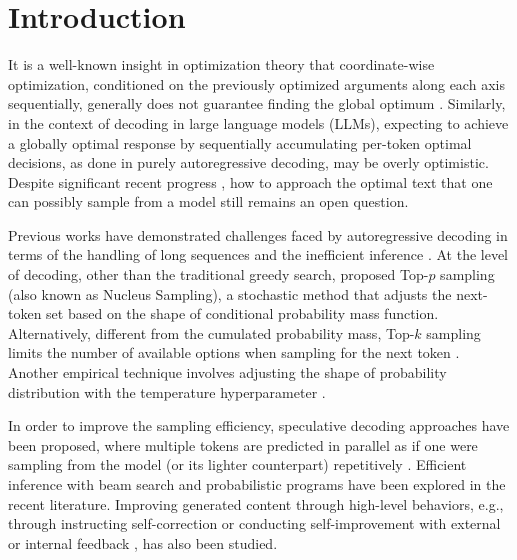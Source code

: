 \section{Introduction}\label{main:introduction}
It is a well-known insight in optimization theory that coordinate-wise optimization, conditioned on the previously optimized arguments along each axis sequentially, generally does not guarantee finding the global optimum \citep{torn1989global,nocedal1999numerical}.
Similarly, in the context of decoding in large language models (LLMs), expecting to achieve a globally optimal response by sequentially accumulating per-token optimal decisions, as done in purely autoregressive decoding, may be overly optimistic.
Despite significant recent progress \citep{vaswani2017attention,radford2019language,brown2020language,openai2023gpt4,touvron2023llama,google2023gemini,meta2024llama,deepmind2024gemma,abdin2024phi4,deepseek2025deepseek}, how to approach the optimal text that one can possibly sample from a model still remains an open question.

Previous works have demonstrated challenges faced by autoregressive decoding in terms of the handling of long sequences \citep{wu2021autoformer} and the inefficient inference \citep{lin2021limitations,li2022elmer}.
At the level of decoding, other than the traditional greedy search, \citet{holtzman2020curious} proposed Top-$p$ sampling (also known as Nucleus Sampling), a stochastic method that adjusts the next-token set based on the shape of conditional probability mass function.
Alternatively, different from the cumulated probability mass, Top-$k$ sampling limits the number of available options when sampling for the next token \citep{fan2018hierarchical,holtzman2018learning,radford2019language}.
Another empirical technique involves adjusting the shape of probability distribution with the temperature hyperparameter \citep{fan2018hierarchical,holtzman2018learning,peeperkorn2024temperature}.

In order to improve the sampling efficiency, speculative decoding approaches have been proposed, where multiple tokens are predicted in parallel as if one were sampling from the model (or its lighter counterpart) repetitively \citep{leviathan2023fast,chen2023accelerating,xia2023speculative,kim2024speculative,sun2024spectr}.
Efficient inference with beam search \citep{xie2024self,zhu2024deductive,wei2024confidence,yang2024language} and probabilistic programs \citep{lew2023smcp3} have been explored in the recent literature.
Improving generated content through high-level behaviors, e.g., through instructing self-correction or conducting self-improvement with external or internal feedback \citep{yao2022react,bai2022constitutional,pan2023automatically,shinn2023reflexion,ganguli2023capacity,chen2023teaching,kim2023language,tyen2023llms,madaan2024self}, has also been studied.


